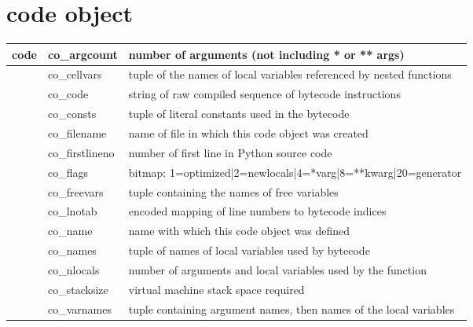 \documentclass{icldt}
\numberwithin{equation}{section}       %
\newcommand{\blankpage}{
\newpage
\thispagestyle{empty}
\mbox{}
\newpage
}
\begin{document}
{{\section{code object}
\begin{tabularx}{\textwidth}{ |l|l|l| }
	\hline
	code & co_argcount & number of arguments (not including * or ** args) \\
	\hline
	& co_cellvars & tuple of the names of local variables referenced by nested functions \\
	\hline
	& co_code & string of raw compiled sequence of bytecode instructions \\
	\hline
	& co_consts & tuple of literal constants used in the bytecode \\
	\hline
	& co_filename & name of file in which this code object was created \\
	\hline
	& co_firstlineno & number of first line in Python source code \\
	\hline
	& co_flags & bitmap: 1=optimized|2=newlocals|4=*varg|8=**kwarg|20=generator \\
	\hline
	& co_freevars & tuple containing the names of free variables \\
	\hline
	& co_lnotab & encoded mapping of line numbers to bytecode indices \\
	\hline
	& co_name & name with which this code object was defined \\
	\hline
	& co_names & tuple of names of local variables used by bytecode \\
	\hline
	& co_nlocals & number of arguments and local variables used by the function \\
	\hline
	& co_stacksize & virtual machine stack space required \\
	\hline
	& co_varnames & tuple containing argument names, then names of the local variables \\
	\hline
\end{tabularx}

}}
\end{document}
